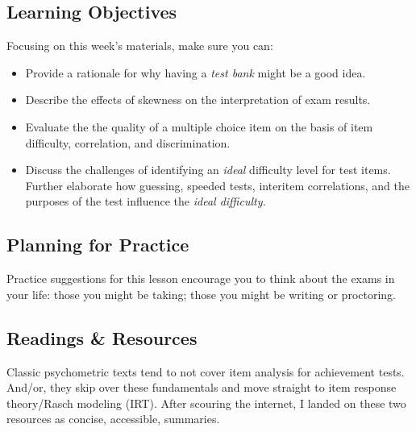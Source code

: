 \documentclass[
  english,
]{book}
\providecommand{\tightlist}{%
  \setlength{\itemsep}{0pt}\setlength{\parskip}{0pt}}
\begin{document}
\hypertarget{learning-objectives-4}{%
\subsection{Learning Objectives}\label{learning-objectives-4}}

Focusing on this week's materials, make sure you can:

\begin{itemize}
\tightlist
\item
  Provide a rationale for why having a \emph{test bank} might be a good idea.
\item
  Describe the effects of skewness on the interpretation of exam results.
\item
  Evaluate the the quality of a multiple choice item on the basis of item difficulty, correlation, and discrimination.
\item
  Discuss the challenges of identifying an \emph{ideal} difficulty level for test items. Further elaborate how guessing, speeded tests, interitem correlations, and the purposes of the test influence the \emph{ideal difficulty.}
\end{itemize}

\hypertarget{planning-for-practice-4}{%
\subsection{Planning for Practice}\label{planning-for-practice-4}}

Practice suggestions for this lesson encourage you to think about the exams in your life: those you might be taking; those you might be writing or proctoring.

\hypertarget{readings-resources-4}{%
\subsection{Readings \& Resources}\label{readings-resources-4}}

Classic psychometric texts tend to not cover item analysis for achievement tests. And/or, they skip over these fundamentals and move straight to item response theory/Rasch modeling (IRT). After scouring the internet, I landed on these two resources as concise, accessible, summaries.
\end{document}

